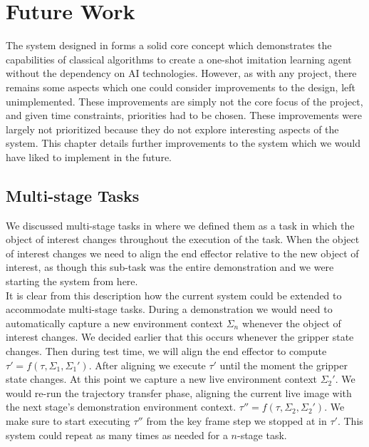 \chapter{Future Work}
\label{chap:future}

The system designed in  forms a solid core concept which demonstrates the capabilities of classical algorithms to create a one-shot imitation learning agent without the dependency on AI technologies. However, as with any project, there remains some aspects which one could consider improvements to the design, left unimplemented. These improvements are simply not the core focus of the project, and given time constraints, priorities had to be chosen. These improvements were largely not prioritized because they do not explore interesting aspects of the system.
This chapter details further improvements to the system which we would have liked to implement in the future.

\section{Multi-stage Tasks}
We discussed multi-stage tasks in  where we defined them as a task in which the object of interest changes throughout the execution of the task. When the object of interest changes we need to align the end effector relative to the new object of interest, as though this sub-task was the entire demonstration and we were starting the system from here.\\

It is clear from this description how the current system could be extended to accommodate multi-stage tasks. During a demonstration we would need to automatically capture a new environment context $\Sigma_n$ whenever the object of interest changes. We decided earlier that this occurs whenever the gripper state changes. Then during test time, we will align the end effector to compute $\tau' = f(\tau, \Sigma_1, \Sigma_1')$. After aligning we execute $\tau'$ until the moment the gripper state changes. At this point we capture a new live environment context $\Sigma_2'$. We would re-run the trajectory transfer phase, aligning the current live image with the next stage's demonstration environment context. $\tau'' = f(\tau, \Sigma_2, \Sigma_2')$. We make sure to start executing $\tau''$ from the key frame step we stopped at in $\tau'$. This system could repeat as many times as needed for a $n$-stage task.\\

